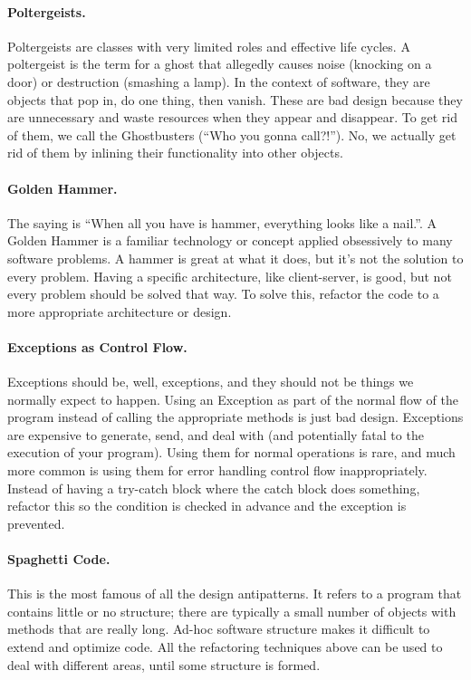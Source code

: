 \paragraph{Poltergeists.}
Poltergeists are classes with very limited roles and effective life cycles. A poltergeist is the term for a ghost that allegedly causes noise (knocking on a door) or destruction (smashing a lamp). In the context of software, they are objects that pop in, do one thing, then vanish. These are bad design because they are unnecessary and waste resources when they appear and disappear. To get rid of them, we call the Ghostbusters (``Who you gonna call?!''). No, we actually get rid of them by inlining their functionality into other objects.


\paragraph{Golden Hammer.}
The saying is ``When all you have is hammer, everything looks like a nail.''. A Golden Hammer is a familiar technology or concept applied obsessively to many software problems. A hammer is great at what it does, but it's not the solution to every problem. Having a specific architecture, like client-server, is good, but not every problem should be solved that way. To solve this, refactor the code to a more appropriate architecture or design.

\paragraph{Exceptions as Control Flow.}
Exceptions should be, well, exceptions, and they should not be things we normally expect to happen. Using an Exception as part of the normal flow of the program instead of calling the appropriate methods is just bad design. Exceptions are expensive to generate, send, and deal with (and potentially fatal to the execution of your program). Using them for normal operations is rare, and much more common is using them for error handling control flow inappropriately. Instead of having a try-catch block where the catch block does something, refactor this so the condition is checked in advance and the exception is prevented.


\paragraph{Spaghetti Code.}
This is the most famous of all the design antipatterns. It refers to a program that contains little or no structure; there are typically a small number of objects with methods that are really long. Ad-hoc software structure makes it difficult to extend and optimize code. All the refactoring techniques above can be used to deal with different areas, until some structure is formed.


